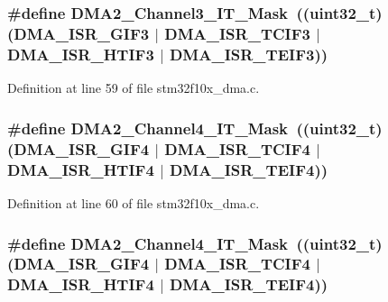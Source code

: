 \subsubsection[{\texorpdfstring{D\+M\+A2\+\_\+\+Channel3\+\_\+\+I\+T\+\_\+\+Mask}{DMA2_Channel3_IT_Mask}}]{\setlength{\rightskip}{0pt plus 5cm}\#define D\+M\+A2\+\_\+\+Channel3\+\_\+\+I\+T\+\_\+\+Mask~(({\bf uint32\+\_\+t})({\bf D\+M\+A\+\_\+\+I\+S\+R\+\_\+\+G\+I\+F3} $\vert$ {\bf D\+M\+A\+\_\+\+I\+S\+R\+\_\+\+T\+C\+I\+F3} $\vert$ {\bf D\+M\+A\+\_\+\+I\+S\+R\+\_\+\+H\+T\+I\+F3} $\vert$ {\bf D\+M\+A\+\_\+\+I\+S\+R\+\_\+\+T\+E\+I\+F3}))}\hypertarget{group___d_m_a___private___defines_ga96bd8d986420e19b3ce94bd67a48b24a}{}\label{group___d_m_a___private___defines_ga96bd8d986420e19b3ce94bd67a48b24a}


Definition at line 59 of file stm32f10x\+\_\+dma.\+c.

\subsubsection[{\texorpdfstring{D\+M\+A2\+\_\+\+Channel4\+\_\+\+I\+T\+\_\+\+Mask}{DMA2_Channel4_IT_Mask}}]{\setlength{\rightskip}{0pt plus 5cm}\#define D\+M\+A2\+\_\+\+Channel4\+\_\+\+I\+T\+\_\+\+Mask~(({\bf uint32\+\_\+t})({\bf D\+M\+A\+\_\+\+I\+S\+R\+\_\+\+G\+I\+F4} $\vert$ {\bf D\+M\+A\+\_\+\+I\+S\+R\+\_\+\+T\+C\+I\+F4} $\vert$ {\bf D\+M\+A\+\_\+\+I\+S\+R\+\_\+\+H\+T\+I\+F4} $\vert$ {\bf D\+M\+A\+\_\+\+I\+S\+R\+\_\+\+T\+E\+I\+F4}))}\hypertarget{group___d_m_a___private___defines_gae844f9b933a07a6f75472c3f849cbb5c}{}\label{group___d_m_a___private___defines_gae844f9b933a07a6f75472c3f849cbb5c}


Definition at line 60 of file stm32f10x\+\_\+dma.\+c.

\subsubsection[{\texorpdfstring{D\+M\+A2\+\_\+\+Channel4\+\_\+\+I\+T\+\_\+\+Mask}{DMA2_Channel4_IT_Mask}}]{\setlength{\rightskip}{0pt plus 5cm}\#define D\+M\+A2\+\_\+\+Channel4\+\_\+\+I\+T\+\_\+\+Mask~(({\bf uint32\+\_\+t})({\bf D\+M\+A\+\_\+\+I\+S\+R\+\_\+\+G\+I\+F4} $\vert$ {\bf D\+M\+A\+\_\+\+I\+S\+R\+\_\+\+T\+C\+I\+F4} $\vert$ {\bf D\+M\+A\+\_\+\+I\+S\+R\+\_\+\+H\+T\+I\+F4} $\vert$ {\bf D\+M\+A\+\_\+\+I\+S\+R\+\_\+\+T\+E\+I\+F4}))}\hypertarget{group___d_m_a___private___defines_gae844f9b933a07a6f75472c3f849cbb5c}{}\label{group___d_m_a___private___defines_gae844f9b933a07a6f75472c3f849cbb5c}


